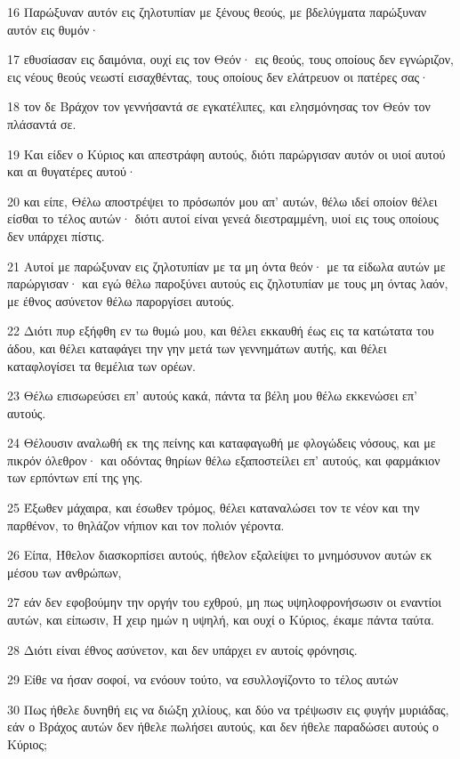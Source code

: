 \par 16 Παρώξυναν αυτόν εις ζηλοτυπίαν με ξένους θεούς, με βδελύγματα παρώξυναν αυτόν εις θυμόν·
\par 17 εθυσίασαν εις δαιμόνια, ουχί εις τον Θεόν· εις θεούς, τους οποίους δεν εγνώριζον, εις νέους θεούς νεωστί εισαχθέντας, τους οποίους δεν ελάτρευον οι πατέρες σας·
\par 18 τον δε Βράχον τον γεννήσαντά σε εγκατέλιπες, και ελησμόνησας τον Θεόν τον πλάσαντά σε.
\par 19 Και είδεν ο Κύριος και απεστράφη αυτούς, διότι παρώργισαν αυτόν οι υιοί αυτού και αι θυγατέρες αυτού·
\par 20 και είπε, Θέλω αποστρέψει το πρόσωπόν μου απ' αυτών, θέλω ιδεί οποίον θέλει είσθαι το τέλος αυτών· διότι αυτοί είναι γενεά διεστραμμένη, υιοί εις τους οποίους δεν υπάρχει πίστις.
\par 21 Αυτοί με παρώξυναν εις ζηλοτυπίαν με τα μη όντα θεόν· με τα είδωλα αυτών με παρώργισαν· και εγώ θέλω παροξύνει αυτούς εις ζηλοτυπίαν με τους μη όντας λαόν, με έθνος ασύνετον θέλω παροργίσει αυτούς.
\par 22 Διότι πυρ εξήφθη εν τω θυμώ μου, και θέλει εκκαυθή έως εις τα κατώτατα του άδου, και θέλει καταφάγει την γην μετά των γεννημάτων αυτής, και θέλει καταφλογίσει τα θεμέλια των ορέων.
\par 23 Θέλω επισωρεύσει επ' αυτούς κακά, πάντα τα βέλη μου θέλω εκκενώσει επ' αυτούς.
\par 24 Θέλουσιν αναλωθή εκ της πείνης και καταφαγωθή με φλογώδεις νόσους, και με πικρόν όλεθρον· και οδόντας θηρίων θέλω εξαποστείλει επ' αυτούς, και φαρμάκιον των ερπόντων επί της γης.
\par 25 Έξωθεν μάχαιρα, και έσωθεν τρόμος, θέλει καταναλώσει τον τε νέον και την παρθένον, το θηλάζον νήπιον και τον πολιόν γέροντα.
\par 26 Είπα, Ήθελον διασκορπίσει αυτούς, ήθελον εξαλείψει το μνημόσυνον αυτών εκ μέσου των ανθρώπων,
\par 27 εάν δεν εφοβούμην την οργήν του εχθρού, μη πως υψηλοφρονήσωσιν οι εναντίοι αυτών, και είπωσιν, Η χειρ ημών η υψηλή, και ουχί ο Κύριος, έκαμε πάντα ταύτα.
\par 28 Διότι είναι έθνος ασύνετον, και δεν υπάρχει εν αυτοίς φρόνησις.
\par 29 Είθε να ήσαν σοφοί, να ενόουν τούτο, να εσυλλογίζοντο το τέλος αυτών
\par 30 Πως ήθελε δυνηθή εις να διώξη χιλίους, και δύο να τρέψωσιν εις φυγήν μυριάδας, εάν ο Βράχος αυτών δεν ήθελε πωλήσει αυτούς, και δεν ήθελε παραδώσει αυτούς ο Κύριος;
